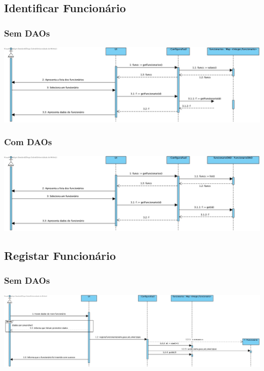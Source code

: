 \subsection{Identificar Funcionário}
\subsubsection{Sem DAOs}
\begin{center}
 	\includegraphics[width = 5.5in]{DSI/DSI-Identificar_Funcionario.jpg}
\end{center}
\subsubsection{Com DAOs}
\begin{center}
 	\includegraphics[width = 5.5in]{DSI_D/DSI-DAOs-Identificar_Funcionario.jpg}
\end{center}

\subsection{Registar Funcionário}
\subsubsection{Sem DAOs}
\begin{center}
 	\includegraphics[width = 5.5in]{DSI/DSI-Registar_Funcionario.jpg}
\end{center}
